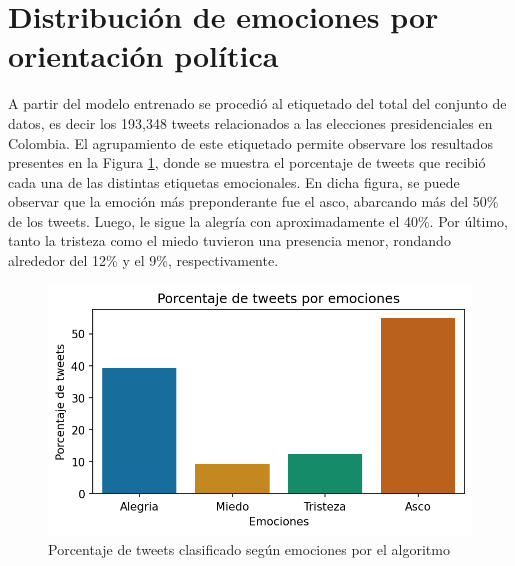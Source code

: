 \scriptsize

\normalsize







\section{Distribución de emociones por orientación política}


A partir del modelo entrenado se procedió al etiquetado del total del conjunto de datos, es decir los 193,348 tweets relacionados a las elecciones presidenciales en Colombia. El agrupamiento de este etiquetado permite observare  los resultados presentes en la Figura \ref{figure:tweets_total}, donde se muestra el porcentaje de tweets que recibió cada una de las distintas etiquetas emocionales. En dicha figura, se puede observar que la emoción más preponderante fue el asco, abarcando más del 50\% de los tweets. Luego, le sigue la alegría con aproximadamente el 40\%. Por último, tanto la tristeza como el miedo tuvieron una presencia menor, rondando alrededor del 12\% y el 9\%, respectivamente.



\begin{figure}[!htbp]
	\centering
	\includegraphics{Images & Logos/Results/Cantidad_de_tweets__por_emocion.png} 
	\caption{Porcentaje de tweets clasificado según emociones por el algoritmo}
	\label{figure:tweets_total}
\end{figure}



